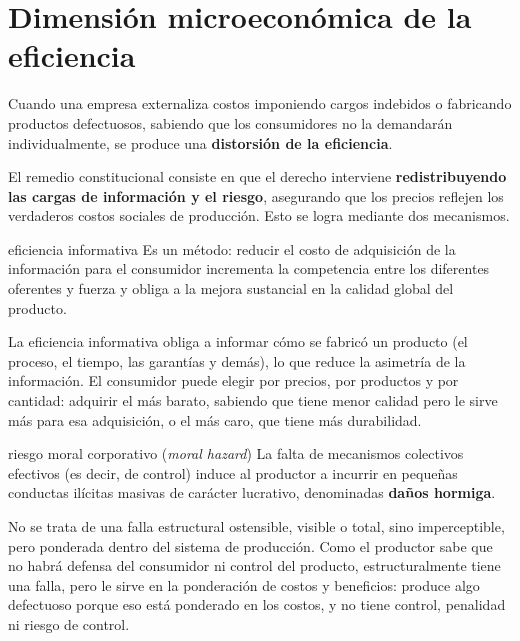 \documentclass[12pt,oneside]{book}
\begin{document}
\section{Dimensi\'on microecon\'omica de la eficiencia}

Cuando una empresa externaliza costos imponiendo cargos indebidos o fabricando productos defectuosos, sabiendo que los consumidores no la demandar\'an individualmente, se produce una \textbf{distorsi\'on de la eficiencia}.

El remedio constitucional consiste en que el derecho interviene \textbf{redistribuyendo las cargas de informaci\'on y el riesgo}, asegurando que los precios reflejen los verdaderos costos sociales de producci\'on. Esto se logra mediante dos mecanismos.

\begin{definition}{eficiencia informativa}
Es un m\'etodo: reducir el costo de adquisici\'on de la informaci\'on para el consumidor incrementa la competencia entre los diferentes oferentes y fuerza y obliga a la mejora sustancial en la calidad global del producto.
\end{definition}

La eficiencia informativa obliga a informar c\'omo se fabric\'o un producto (el proceso, el tiempo, las garant\'ias y dem\'as), lo que reduce la asimetr\'ia de la informaci\'on. El consumidor puede elegir por precios, por productos y por cantidad: adquirir el m\'as barato, sabiendo que tiene menor calidad pero le sirve m\'as para esa adquisici\'on, o el m\'as caro, que tiene m\'as durabilidad.

\begin{definition}{riesgo moral corporativo (\emph{moral hazard})}
La falta de mecanismos colectivos efectivos (es decir, de control) induce al productor a incurrir en peque\~nas conductas il\'icitas masivas de car\'acter lucrativo, denominadas \textbf{da\~nos hormiga}.
\end{definition}

No se trata de una falla estructural ostensible, visible o total, sino imperceptible, pero ponderada dentro del sistema de producci\'on. Como el productor sabe que no habr\'a defensa del consumidor ni control del producto,%
{} estructuralmente tiene una falla, pero le sirve en la ponderaci\'on de costos y beneficios: produce algo defectuoso porque eso est\'a ponderado en los costos, y no tiene control, penalidad ni riesgo de control.
\end{document}
